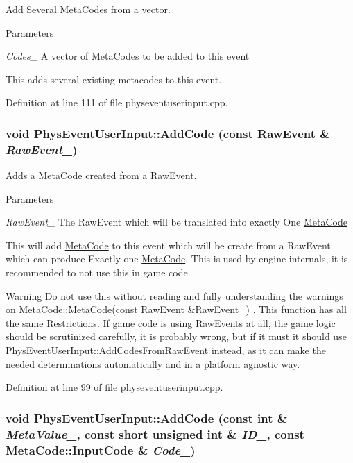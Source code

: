 Add Several MetaCodes from a vector. 
\begin{DoxyParams}{Parameters}
\item[{\em Codes\_\-}]A vector of MetaCodes to be added to this event\end{DoxyParams}
This adds several existing metacodes to this event. 

Definition at line 111 of file physeventuserinput.cpp.\hypertarget{classPhysEventUserInput_a385a4f7a6e88be43b6ba1ffc2a1bb5e3}{
\subsubsection[{AddCode}]{\setlength{\rightskip}{0pt plus 5cm}void PhysEventUserInput::AddCode (const RawEvent \& {\em RawEvent\_\-})}}
\label{dc/d0e/classPhysEventUserInput_a385a4f7a6e88be43b6ba1ffc2a1bb5e3}


Adds a \hyperlink{classMetaCode}{MetaCode} created from a RawEvent. 
\begin{DoxyParams}{Parameters}
\item[{\em RawEvent\_\-}]The RawEvent which will be translated into exactly One \hyperlink{classMetaCode}{MetaCode}\end{DoxyParams}
This will add \hyperlink{classMetaCode}{MetaCode} to this event which will be create from a RawEvent which can produce Exactly one \hyperlink{classMetaCode}{MetaCode}. This is used by engine internals, it is recommended to not use this in game code. \begin{DoxyWarning}{Warning}
Do not use this without reading and fully understanding the warnings on \hyperlink{classMetaCode_a87b260ce7ee3a66c75320c0fc37cdc0a}{MetaCode::MetaCode(const RawEvent \&RawEvent\_\-)} . This function has all the same Restrictions. If game code is using RawEvents at all, the game logic should be scrutinized carefully, it is probably wrong, but if it must it should use \hyperlink{classPhysEventUserInput_a9e42f42f9a4a42f792e5cf95856669c0}{PhysEventUserInput::AddCodesFromRawEvent} instead, as it can make the needed determinations automatically and in a platform agnostic way. 
\end{DoxyWarning}


Definition at line 99 of file physeventuserinput.cpp.\hypertarget{classPhysEventUserInput_ace3b98a502b8e784b58bc5dc599fc0c4}{
\subsubsection[{AddCode}]{\setlength{\rightskip}{0pt plus 5cm}void PhysEventUserInput::AddCode (const int \& {\em MetaValue\_\-}, \/  const short unsigned int \& {\em ID\_\-}, \/  const {\bf MetaCode::InputCode} \& {\em Code\_\-})}}
\label{dc/d0e/classPhysEventUserInput_ace3b98a502b8e784b58bc5dc599fc0c4}


